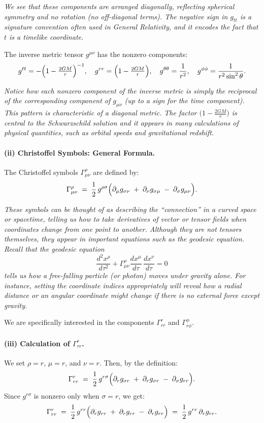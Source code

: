 \emph{We see that these components are arranged diagonally, reflecting spherical symmetry and no rotation (no off-diagonal terms). The negative sign in \(g_{tt}\) is a signature convention often used in General Relativity, and it encodes the fact that \(t\) is a timelike coordinate.}

\smallskip

\noindent
The inverse metric tensor \(g^{\mu\nu}\) has the nonzero components:
\[
g^{tt} 
= 
-\Bigl(1 - \tfrac{2GM}{r}\Bigr)^{-1},
\quad
g^{rr} 
= 
\Bigl(1 - \tfrac{2GM}{r}\Bigr),
\quad
g^{\theta\theta} 
= 
\frac{1}{r^2},
\quad
g^{\phi\phi} 
= 
\frac{1}{r^2 \sin^2\theta}.
\]

\emph{Notice how each nonzero component of the inverse metric is simply the reciprocal of the corresponding component of \(g_{\mu\nu}\) (up to a sign for the time component). This pattern is characteristic of a diagonal metric. The factor \(\bigl(1 - \frac{2GM}{r}\bigr)\) is central to the Schwarzschild solution and it appears in many calculations of physical quantities, such as orbital speeds and gravitational redshift.}

\paragraph{(ii) Christoffel Symbols: General Formula.}
The Christoffel symbols \(\Gamma^\rho_{\mu\nu}\) are defined by:
\[
\Gamma^\rho_{\mu \nu} 
\;=\;
\frac{1}{2} \, g^{\rho \sigma}
\Bigl(
\partial_\mu g_{\sigma\nu}
\;+\;
\partial_\nu g_{\sigma\mu}
\;-\;
\partial_\sigma g_{\mu\nu}
\Bigr).
\]

\emph{These symbols can be thought of as describing the ``connection'' in a curved space or spacetime, telling us how to take derivatives of vector or tensor fields when coordinates change from one point to another. Although they are not tensors themselves, they appear in important equations such as the geodesic equation. Recall that the geodesic equation}
\[
\frac{d^2 x^\rho}{d\tau^2} 
+ 
\Gamma^\rho_{\mu\nu} 
\frac{dx^\mu}{d\tau}\,\frac{dx^\nu}{d\tau} 
= 0
\]
\emph{tells us how a free-falling particle (or photon) moves under gravity alone. For instance, setting the coordinate indices appropriately will reveal how a radial distance or an angular coordinate might change if there is no external force except gravity.}

\noindent
We are specifically interested in the components \(\Gamma^r_{rr}\) and \(\Gamma^\phi_{r\phi}\).

\paragraph{(iii) Calculation of \(\Gamma^r_{rr}\).}
We set \(\rho = r\), \(\mu = r\), and \(\nu = r\). Then, by the definition:
\[
\Gamma^r_{rr}
\;=\;
\frac{1}{2}\,g^{r\sigma}
\Bigl(
\partial_r g_{\sigma r}
\;+\;
\partial_r g_{\sigma r}
\;-\;
\partial_\sigma g_{rr}
\Bigr).
\]
Since \(g^{r\sigma}\) is nonzero only when \(\sigma = r\), we get:
\[
\Gamma^r_{rr}
\;=\;
\frac{1}{2}\, g^{rr}
\Bigl(
\partial_r g_{rr}
\;+\;
\partial_r g_{rr}
\;-\;
\partial_r g_{rr}
\Bigr)
\;=\;
\frac{1}{2}\, g^{rr} \,\partial_r g_{rr}.
\]

